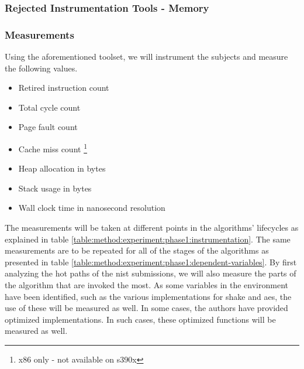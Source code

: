 \subsubsection{Rejected Instrumentation Tools - Memory}
\label{section:method:experiment:phase1:rejected-toolset-memory}

\subsubsection{Measurements}
\label{section:method:experiment:phase1:measurements}


Using the aforementioned toolset, we will instrument the subjects and measure the following values.

\begin{itemize}
    \item Retired instruction count
    \item Total cycle count
    \item Page fault count
    \item Cache miss count \footnote{x86 only - not available on s390x}
    \item Heap allocation in bytes
    \item Stack usage in bytes
    \item Wall clock time in nanosecond resolution
\end{itemize}

The measurements will be taken at different points in the algorithms' lifecycles as explained in table \ref{table:method:experiment:phase1:instrumentation}. The same measurements are to be repeated for all of the stages of the algorithms as presented in table \ref{table:method:experiment:phase1:dependent-variables}. By first analyzing the hot paths of the \gls{nist} submissions, we will also measure the parts of the algorithm that are invoked the most. As some variables in the environment have been identified, such as the various implementations for \gls{shake} and \gls{aes}, the use of these will be measured as well. In some cases, the authors have provided optimized implementations. In such cases, these optimized functions will be measured as well.

